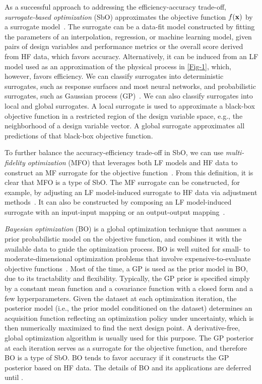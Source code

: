 \documentclass[iicol,sn-basic]{sn-jnl}%
\begin{document}
As a successful approach to addressing the efficiency-accuracy trade-off, \textit{surrogate-based optimization} (SbO) approximates the objective function $f(\bf x)$ by a surrogate model~\citep{Queipo2005,Wang2006,Forrester2008,Simpson2008,Forrester2009}.
The surrogate can be a data-fit model constructed by fitting the parameters of an interpolation, regression, or machine learning model, given pairs of design variables and performance metrics or the overall score derived from HF data, which favors accuracy.
Alternatively, it can be induced from an LF model used as an approximation of the physical process in \cref{Fig-1}, which, however, favors efficiency.
We can classify surrogates into deterministic surrogates, such as response surfaces and most neural networks, and probabilistic surrogates, such as Gaussian process (GP)~\citep{Rasmussen2006}.
We can also classify surrogates into local and global surrogates.
A local surrogate is used to approximate a black-box objective function in a restricted region of the design variable space, e.g., the neighborhood of a design variable vector.
A global surrogate approximates all predictions of that black-box objective function.

To further balance the accuracy-efficiency trade-off in SbO, we can use \textit{multi-fidelity optimization} (MFO) that leverages both LF models and HF data to construct an MF surrogate for the objective function~\citep{Alexandrov1998,Huang2006smo,Forrester2007,Viana2014}.
From this definition, it is clear that MFO is a type of SbO.
The MF surrogate can be constructed, for example, by adjusting an LF model-induced surrogate to HF data via adjustment methods~\citep{Kennedy2000,Han2012,Gratiet2014}.
It can also be constructed by composing an LF model-induced surrogate with an input-input mapping or an output-output mapping~\citep{Bandler1994,Bandler2004,Perdikaris2017}.

\textit{Bayesian optimization} (BO) is a global optimization technique that assumes a prior probabilistic model on the objective function, and combines it with the available data to guide the optimization process.
BO is well suited for small- to moderate-dimensional optimization problems that involve expensive-to-evaluate objective functions~\citep{Snoek2012,Shahriari2016,Frazier2018}.
Most of the time, a GP is used as the prior model in BO, due to its tractability and flexibility.
Typically, the GP prior is specified simply by a constant mean function and a covariance function with a closed form and a few hyperparameters.
Given the dataset at each optimization iteration, the posterior model (i.e., the prior model conditioned on the dataset) determines an acquisition function reflecting an optimization policy under uncertainty, which is then numerically maximized to find the next design point.
A derivative-free, global optimization algorithm is usually used for this purpose.
The GP posterior at each iteration serves as a surrogate for the objective function, and therefore BO is a type of SbO.
BO tends to favor accuracy if it constructs the GP posterior based on HF data.
The details of BO and its applications are deferred until .  
\end{document}
